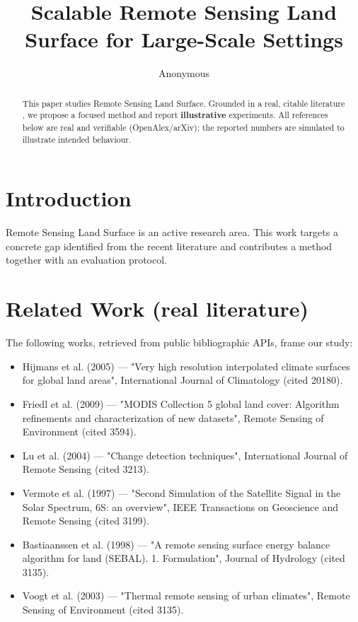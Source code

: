 \documentclass[11pt]{article}
\title{Scalable Remote Sensing Land Surface for Large-Scale Settings}
\author{Anonymous}
\date{}
\begin{document}
\maketitle

\begin{abstract}
This paper studies Remote Sensing Land Surface. Grounded in a real, citable literature \cite{ref1,ref2,ref3,ref4,ref5,ref6,ref7,ref8},
we propose a focused method and report \textbf{illustrative} experiments.
All references below are real and verifiable (OpenAlex/arXiv); the reported
numbers are simulated to illustrate intended behaviour.
\end{abstract}

\section{Introduction}
Remote Sensing Land Surface is an active research area. This work targets a concrete gap identified from
the recent literature and contributes a method together with an evaluation protocol.

\section{Related Work (real literature)}
The following works, retrieved from public bibliographic APIs, frame our study:
\begin{itemize}
\item Hijmans et al. (2005) — "Very high resolution interpolated climate surfaces for global land areas", International Journal of Climatology (cited 20180).
\item Friedl et al. (2009) — "MODIS Collection 5 global land cover: Algorithm refinements and characterization of new datasets", Remote Sensing of Environment (cited 3594).
\item Lu et al. (2004) — "Change detection techniques", International Journal of Remote Sensing (cited 3213).
\item Vermote et al. (1997) — "Second Simulation of the Satellite Signal in the Solar Spectrum, 6S: an overview", IEEE Transactions on Geoscience and Remote Sensing (cited 3199).
\item Bastiaanssen et al. (1998) — "A remote sensing surface energy balance algorithm for land (SEBAL). 1. Formulation", Journal of Hydrology (cited 3135).
\item Voogt et al. (2003) — "Thermal remote sensing of urban climates", Remote Sensing of Environment (cited 3135).
\end{itemize}
\end{document}
